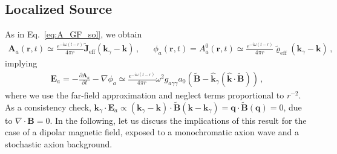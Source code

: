 \documentclass[a4paper,11pt]{article}
\begin{document}
\subsection{Localized Source}

As in Eq.~\eqref{eq:A_GF_sol}, we obtain
\begin{equation}
    \begin{aligned}
    {\bm A}_{a}({\bm r} , t)  \simeq \frac{e^{-i \omega (t - r)}}{4 \pi r} \tilde{\bm{J}}_{\text{eff} } ( \bm{k}_{\gamma} -  \bm k)\, , &&  \phi_{a}({\bm r} , t) = 
      {A}_{a}^{0}({\bm r} , t)   \simeq \frac{e^{-i \omega (t - r)}}{4 \pi r} \tilde{\varrho}_{\text{eff} } ( \bm{k}_{\gamma} -  \bm k)\, ,
    \end{aligned}
\end{equation}
implying
\begin{align}
    \bm{E}_{a} = -\frac{\partial \bm{A}_{a}}{\partial t} - \nabla \phi_{a} \simeq \frac{e^{-i \omega (t - r)} }{4\pi r} \omega^{2} g_{a\gamma\gamma} a_{0} \left( \tilde{\bm{B}} -  \hat{\bm{k}}_{\gamma} (\hat{ \bm{k}} \cdot \tilde{\bm{B}}) \right)  \,,
\end{align}
where we use the far-field approximation and neglect terms proportional to $r^{-2}$. As a consistency check, $
    \bm{k}_{\gamma} \cdot \bm{E}_{a} \propto ( \bm{k}_{\gamma} - \bm{k} ) \cdot \tilde{\bm{B}}  (\bm{k} - \bm{k}_{\gamma} ) = \bm{q} \cdot \tilde{\bm{B}} (\bm{q}) = 0
$, due to $ \nabla \cdot \bm{B} = 0 $.
In the following, let us discuss the implications of this result for the case of a dipolar magnetic field, exposed to a monochromatic axion wave and a stochastic axion background.
\end{document}
